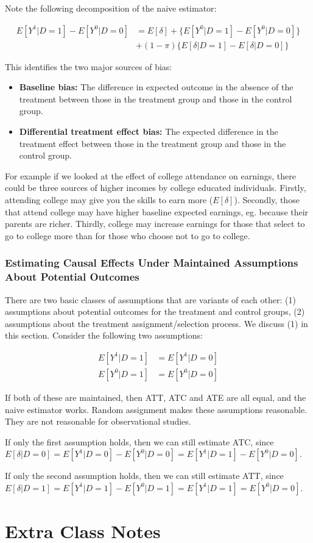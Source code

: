 \documentclass[12 pt, leqno]{article}
\begin{document}
Note the following decomposition of the naive estimator:

\begin{align*}
E[Y^1|D=1] - E[Y^0|D = 0] &= E[\delta] + \{E[Y^0|D = 1] - E[Y^0|D = 0] \} \\
&+ (1-\pi)\{E[\delta|D = 1] - E[\delta | D = 0] \}
\end{align*}

This identifies the two major sources of bias:

\begin{itemize}
\item \textbf{Baseline bias:} The difference in expected outcome in the absence of the treatment between those in the treatment group and those in the control group.

\item \textbf{Differential treatment effect bias:} The expected difference in the treatment effect between those in the treatment group and those in the control group. 
\end{itemize}

For example if we looked at the effect of college attendance on earnings, there could be three sources of higher incomes by college educated individuals. Firstly, attending college may give you the skills to earn more ($E[\delta]$). Secondly, those that attend college may have higher baseline expected earnings, eg. because their parents are richer. Thirdly, college may increase earnings for those that select to go to college more than for those who choose not to go to college. 

\subsubsection{Estimating Causal Effects Under Maintained Assumptions About Potential Outcomes}

There are two basic classes of assumptions that are variants of each other: (1) assumptions about potential outcomes for the treatment and control groups, (2) assumptions about the treatment assignment/selection process. We discuss (1) in this section. Consider the following two assumptions:

\begin{align*}
E[Y^1|D =1]&= E[Y^1|D = 0] \\
E[Y^0|D =1]&= E[Y^0|D = 0]
\end{align*}

If both of these are maintained, then ATT, ATC and ATE are all equal, and the naive estimator works. Random assignment makes these assumptions reasonable. They are not reasonable for observational studies. 

If only the first assumption holds, then we can still estimate ATC, since $E[\delta|D = 0] = E[Y^1|D=0] - E[Y^0|D=0] = E[Y^1|D=1] - E[Y^0|D=0] $.

If only the second assumption holds, then we can still estimate ATT, since $E[\delta|D = 1] = E[Y^1|D=1] - E[Y^0|D=1] = E[Y^1|D=1] = E[Y^0|D=0]$. 

\section{Extra Class Notes}
\end{document}
